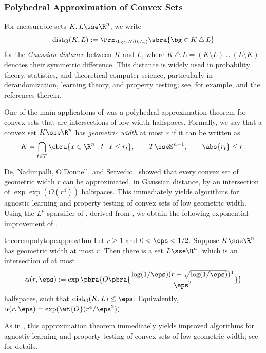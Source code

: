 \documentclass[11pt]{article}
\renewcommand{\S}{\mathbb{S}}
\newcommand{\dG}{\mathrm{dist}_{\mathrm{G}}}
\newcommand{\newalpha}{\alpha(r,\eps)}
\begin{document}
\subsubsection{Polyhedral Approximation of Convex Sets} 
\label{subsec:intro-apps-polytope}

For measurable sets $K,L\sse\R^n$, we write 
\[
	\dG(K,L) := \Prx_{\bg\sim N(0,I_n)}\sbra{\bg \in K\,\triangle\,L}
\]
for the \emph{Gaussian distance} between $K$ and $L$, where 
$K\,\triangle\,L = (K\setminus L)\cup(L\setminus K)$ denotes their symmetric difference. 
This distance is widely used in probability theory, statistics, and theoretical computer science, particularly in derandomization, learning theory, and property testing; see, for example, \cite{DNS23-polytope} and the references therein.

One of the main applications of \cite{de2026sparsifying} was a polyhedral approximation theorem for convex sets that are intersections of low-width halfspaces. 
Formally, we say that a convex set $K\sse\R^n$ has \emph{geometric width} at most $r$ if it can be written as
\[
	K
	=
	\bigcap_{t\in T}
	\cbra{x\in\R^n:t\cdot x\leq r_t},
	\qquad
	T\sse \S^{n-1},
	\qquad
	\abs{r_t}\leq r\,.
\]

De, Nadimpalli, O'Donnell, and Servedio~\cite{de2026sparsifying} showed that every convex set of geometric width $r$ can be approximated, in Gaussian distance, by an intersection of $\exp\exp(O(r^4))$ halfspaces. 
This immediately yields algorithms for agnostic learning and property testing of convex sets of low geometric width. 
Using the $L^p$-sparsifier of , derived from , we obtain the following exponential improvement of \cite[Theorem~3]{de2026sparsifying}. 

\begin{restatable}{theorem}{polytopeapproxthm}
	\label{thm:polytope-approximation}
	Let $r\geq1$ and $0<\eps<1/2$.  Suppose $K\sse\R^n$ has geometric width at
	most $r$.  Then there is a set $L\sse\R^n$, which is an intersection of at
	most
	\[
		\newalpha 
		:=
		\exp\pbra{
			O\pbra{
				\frac{\log(1/\eps)(r+\sqrt{\log(1/\eps)})^4}{\eps^2}
			}
		}
	\]
	halfspaces, such that $\dG(K,L)\leq\eps$.  Equivalently,
	$
		\newalpha 
		=
		\exp(\wt{O}(r^4/\eps^2))
	$.
\end{restatable}

As in \cite{de2026sparsifying}, this approximation theorem immediately yields improved algorithms for agnostic learning and property testing of convex sets of low geometric width; see  for details. 
\end{document}
